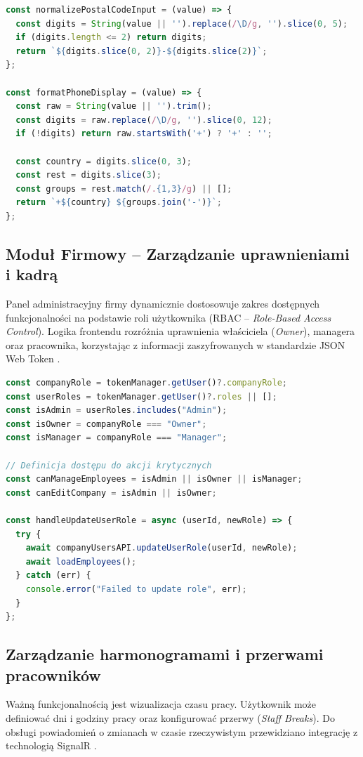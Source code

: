 \begin{lstlisting}[language=JavaScript, caption={Normalizacja kodu pocztowego i formatowanie numeru telefonu (AccountPage.js)}]
const normalizePostalCodeInput = (value) => {
  const digits = String(value || '').replace(/\D/g, '').slice(0, 5);
  if (digits.length <= 2) return digits;
  return `${digits.slice(0, 2)}-${digits.slice(2)}`;
};

const formatPhoneDisplay = (value) => {
  const raw = String(value || '').trim();
  const digits = raw.replace(/\D/g, '').slice(0, 12);
  if (!digits) return raw.startsWith('+') ? '+' : '';
  
  const country = digits.slice(0, 3);
  const rest = digits.slice(3);
  const groups = rest.match(/.{1,3}/g) || [];
  return `+${country} ${groups.join('-')}`;
};
\end{lstlisting}

\subsection{Moduł Firmowy – Zarządzanie uprawnieniami i kadrą}
Panel administracyjny firmy dynamicznie dostosowuje zakres dostępnych funkcjonalności na podstawie roli użytkownika (RBAC – \textit{Role-Based Access Control}). Logika frontendu rozróżnia uprawnienia właściciela (\textit{Owner}), managera oraz pracownika, korzystając z informacji zaszyfrowanych w standardzie JSON Web Token \cite{jwt_rfc}.

\begin{lstlisting}[language=JavaScript, caption={Logika weryfikacji uprawnień wewnątrz organizacji (CompanyPanel.js)}]
const companyRole = tokenManager.getUser()?.companyRole;
const userRoles = tokenManager.getUser()?.roles || [];
const isAdmin = userRoles.includes("Admin");
const isOwner = companyRole === "Owner";
const isManager = companyRole === "Manager";

// Definicja dostępu do akcji krytycznych
const canManageEmployees = isAdmin || isOwner || isManager;
const canEditCompany = isAdmin || isOwner;

const handleUpdateUserRole = async (userId, newRole) => {
  try {
    await companyUsersAPI.updateUserRole(userId, newRole);
    await loadEmployees();
  } catch (err) {
    console.error("Failed to update role", err);
  }
};
\end{lstlisting}

\subsection{Zarządzanie harmonogramami i przerwami pracowników}
Ważną funkcjonalnością jest wizualizacja czasu pracy. Użytkownik może definiować dni i godziny pracy oraz konfigurować przerwy (\textit{Staff Breaks}). Do obsługi powiadomień o zmianach w czasie rzeczywistym przewidziano integrację z technologią SignalR \cite{signalr_microsoft}.

